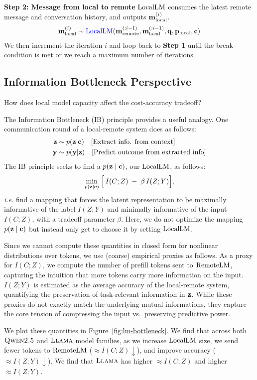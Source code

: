 \textbf{Step 2: Message from local to remote}
$\mathrm{LocalLM}$ consumes the latest remote message and conversation history, and outputs $\mathbf{m}_{\text{local}}^{(i)}$. 
\begin{align*}
    \mathbf{m}_{\text{local}}^{(i)} \sim \textcolor{blue}{\mathrm{LocalLM}}(\mathbf{m}_{\text{remote}}^{(:i - 1)}, \mathbf{m}_{\text{local}}^{(:i - 1)}, \mathbf{q}, \mathbf{p}_{\text{local}}, \mathbf{c})
\end{align*}
We then increment the iteration $i$ and loop back to \textbf{Step 1} until the break condition is met or we reach a maximum number of iterations.



\subsection{Information Bottleneck Perspective}\label{app:info_bottleneck}
How does local model capacity affect the cost-accuracy tradeoff?

The Information Bottleneck (IB) principle \citep{tishby2000information} provides a useful analogy.
One communication round of a local-remote system does as follows:
\begin{align*}
    \mathbf{z} &\sim p(\mathbf{z}|\mathbf{c}) \quad \text{[Extract info. from context]} \\
    \mathbf{y} &\sim p(\mathbf{y}|\mathbf{z}) \quad \text{[Predict outcome from extracted info]}
\end{align*}
The IB principle seeks to find a $p(\mathbf{z} \mid \mathbf{c})$, our $\mathrm{LocalLM}$, as follows:
\begin{equation}
\min_{p(\mathbf{z} \mid \mathbf{c})} \;\Bigl[\, I(C;Z) \;-\; \beta \, I(Z;Y) \Bigr],
\label{eq:ib_formulation}
\end{equation}
\textit{i.e.} find a mapping that forces the latent representation to be maximally informative of the label $I(Z;Y)$ and minimally informative of the input $I(C;Z)$, with a tradeoff parameter $\beta$. Here, we do not optimize the mapping $p(\mathbf{z} \mid \mathbf{c})$ but instead only get to choose it by setting $\mathrm{LocalLM}$.

Since we cannot compute these quantities in closed form for nonlinear distributions over tokens, we use (coarse) empirical proxies as follows. As a proxy for $I(C;Z)$, we compute the number of prefill tokens sent to $\mathrm{RemoteLM}$, capturing the intuition that more tokens carry more information on the input.
$I(Z;Y)$ is estimated as the average accuracy of the local-remote system, quantifying the preservation of task-relevant information in $\mathbf{z}$. While these proxies do not exactly match the underlying mutual informations, they capture the core tension of compressing the input vs.\ preserving predictive power.

We plot these quantities in Figure~\ref{fig:lm-bottleneck}. We find that  across both $\textsc{Qwen2.5}$ and $\textsc{Llama}$ model families, as we increase $\mathrm{LocalLM}$ size, we send fewer tokens to $\mathrm{RemoteLM}$ ($\approx I(C;Z) \downarrow$), and improve accuracy ($\approx I(Z;Y) \downarrow$). We find that $\textsc{Llama}$ has higher $\approx I(C;Z)$ and higher $\approx I(Z;Y)$.



